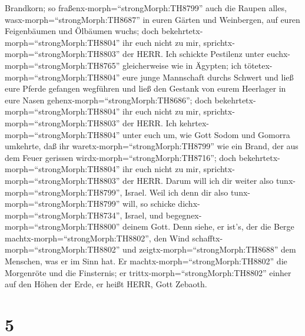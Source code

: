 Brandkorn; so fraßenx-morph=``strongMorph:TH8799'' auch die Raupen
alles, wasx-morph=``strongMorph:TH8687'' in euren Gärten und Weinbergen,
auf euren Feigenbäumen und Ölbäumen wuchs; doch
bekehrtetx-morph=``strongMorph:TH8804'' ihr euch nicht zu mir,
sprichtx-morph=``strongMorph:TH8803'' der HERR.  Ich
schickte Pestilenz unter euchx-morph=``strongMorph:TH8765''
gleicherweise wie in Ägypten; ich tötetex-morph=``strongMorph:TH8804''
eure junge Mannschaft durchs Schwert und ließ eure Pferde gefangen
wegführen und ließ den Gestank von eurem Heerlager in eure Nasen
gehenx-morph=``strongMorph:TH8686''; doch
bekehrtetx-morph=``strongMorph:TH8804'' ihr euch nicht zu mir,
sprichtx-morph=``strongMorph:TH8803'' der HERR.  Ich
kehrtex-morph=``strongMorph:TH8804'' unter euch um, wie Gott Sodom und
Gomorra umkehrte, daß ihr waretx-morph=``strongMorph:TH8799'' wie ein
Brand, der aus dem Feuer gerissen wirdx-morph=``strongMorph:TH8716'';
doch bekehrtetx-morph=``strongMorph:TH8804'' ihr euch nicht zu mir,
sprichtx-morph=``strongMorph:TH8803'' der HERR.  Darum will
ich dir weiter also tunx-morph=``strongMorph:TH8799'', Israel. Weil ich
denn dir also tunx-morph=``strongMorph:TH8799'' will, so schicke
dichx-morph=``strongMorph:TH8734'', Israel, und
begegnex-morph=``strongMorph:TH8800'' deinem Gott.  Denn
siehe, er ist's, der die Berge machtx-morph=``strongMorph:TH8802'', den
Wind schafftx-morph=``strongMorph:TH8802'' und
zeigtx-morph=``strongMorph:TH8688'' dem Menschen, was er im Sinn hat. Er
machtx-morph=``strongMorph:TH8802'' die Morgenröte und die Finsternis;
er trittx-morph=``strongMorph:TH8802'' einher auf den Höhen der Erde, er
heißt HERR, Gott Zebaoth.

\hypertarget{section-4}{%
\section{5}\label{section-4}}

